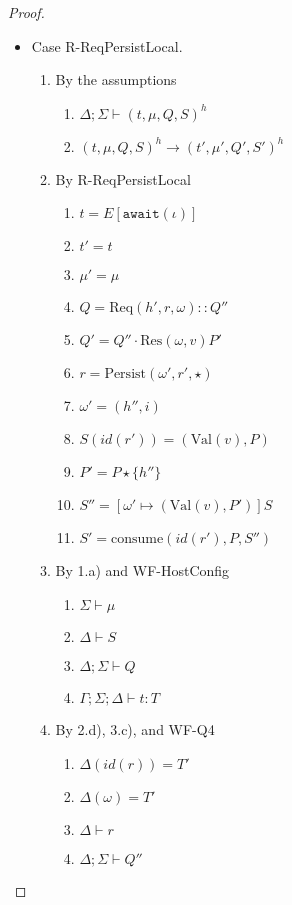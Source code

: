 \documentclass{article}
\theoremstyle{definition}
\newcommand{\Req}[3]{\text{Req}(#1, #2, #3)}
\newcommand{\Res}[2]{\text{Res}(#1, #2)}
\newcommand{\Per}[3]{\text{Persist}(#1, #2, #3)}
\newcommand{\Val}[1]{\text{Val}(#1)}
\newcommand{\consume}[3]{\text{consume}(#1, #2, #3)}
\begin{document}
\begin{proof}
\begin{itemize}
\item Case R-ReqPersistLocal.
\begin{enumerate}
\item By the assumptions
  \begin{enumerate}[label=(\alph*)]
  \item $\Delta ; \Sigma \vdash (t, \mu, Q, S)^h$
  \item $(t, \mu, Q, S)^h \longrightarrow (t', \mu', Q', S')^h$
  \end{enumerate}
\item By R-ReqPersistLocal
  \begin{enumerate}[label=(\alph*)]
  \item $t = E[\texttt{await}(\iota)]$
  \item $t' = t$
  \item $\mu' = \mu$
  \item $Q = {\Req {h'} r \omega} :: Q''$
  \item $Q' = Q'' \cdot {\Res \omega v {P'}}$
  \item $r = {\Per {\omega'} {r'} \star}$  %
  \item $\omega'    = (h'', i)$
  \item $S(id(r'))  = (\Val{v}, P)$
  \item $P'         = P \star \{h''\}$
  \item $S''        = [\omega' \mapsto (\Val{v}, P')]S$
  \item $S'         = {\consume {id(r')} P {S''}}$
  \end{enumerate}
\item By 1.a) and WF-HostConfig
  \begin{enumerate}[label=(\alph*)]
  \item $\Sigma \vdash \mu$
  \item $\Delta \vdash S$
  \item $\Delta ; \Sigma \vdash Q$
  \item $\Gamma ; \Sigma ; \Delta \vdash t : T$
  \end{enumerate}
\item By 2.d), 3.c), and WF-Q4
  \begin{enumerate}[label=(\alph*)]
  \item $\Delta(id(r)) = T'$
  \item $\Delta(\omega) = T'$
  \item $\Delta \vdash r$
  \item $\Delta ; \Sigma \vdash Q''$
  \end{enumerate}

\end{enumerate}
\end{itemize}
\end{proof}
\end{document}
